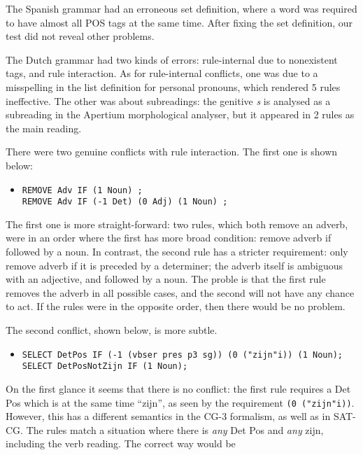 The Spanish grammar had an erroneous set definition, where a word was
required to have almost all POS tags at the same time. After fixing
the set definition, our test did not reveal other problems.

The Dutch grammar had two kinds of errors: rule-internal due to nonexistent tags, and rule interaction. As for rule-internal conflicts, one was due to a misspelling in the list definition for personal pronouns, which rendered 5 rules ineffective. The other was about subreadings: the genitive \emph{s} is analysed as a subreading in the Apertium morphological analyser, but it appeared in 2 rules as the main reading. 

There were two genuine conflicts with rule interaction. The first one is shown below:

\begin{itemize}
\item[] 
\begin{verbatim}REMOVE Adv IF (1 Noun) ;
REMOVE Adv IF (-1 Det) (0 Adj) (1 Noun) ;
\end{verbatim}
\end{itemize}

The first one is more straight-forward: two rules, which both remove an adverb, were in an order where the first has more broad condition: remove adverb if followed by a noun. In contrast, the second rule has a stricter requirement: only remove adverb if it is preceded by a determiner; the adverb itself is ambiguous with an adjective, and followed by a noun. The proble is that the first rule removes the adverb in all possible cases, and the second will not have any chance to act. If the rules were in the opposite order, then there would be no problem.


The second conflict, shown below, is more subtle. 

\begin{itemize}
\item[] 
\begin{verbatim}SELECT DetPos IF (-1 (vbser pres p3 sg)) (0 ("zijn"i)) (1 Noun);
SELECT DetPosNotZijn IF (1 Noun);
\end{verbatim}
\end{itemize}

On the first glance it seems that there is no conflict: the first rule requires a Det Pos which is at the same time ``zijn'', as seen by the requirement \texttt{(0 ("zijn"i))}. However, this has a different semantics in the CG-3 formalism, as well as in SAT-CG. The rules match a situation where there is \emph{any} Det Pos and \emph{any} zijn, including the verb reading. The correct way would be



